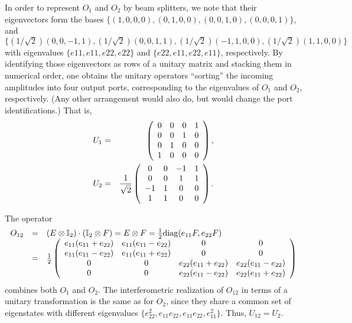 \documentclass[12pt]{iopart}
\begin{document}
In order to represent $O_1$ and $O_2$ by beam splitters,
we note that their eigenvectors form the bases
$
\{(1, 0, 0, 0), (0, 1, 0, 0), (0, 0, 1, 0),  (0, 0, 0, 1)\}$, and
$
\{(1/ \sqrt{2})(0, 0, -1, 1),(1/ \sqrt{2})(0, 0, 1, 1),  (1/ \sqrt{2})(-1, 1, 0, 0), (1/ \sqrt{2})(1, 1, 0, 0)\}
$
with eigenvalues
$\{e11, e11, e22, e22\}$
and
$\{e22, e11, e22, e11\}$, respectively.
By identifying those eigenvectors as rows of a unitary
matrix and stacking them in numerical order, one obtains the
unitary operators ``sorting'' the incoming
amplitudes into four output ports, corresponding to the eigenvalues
of $O_1$ and $O_2$, respectively.
(Any other arrangement would also do, but would change the port identifications.)
That is,
\begin{eqnarray}
U_1 & = &
\left(
\begin{array}{cccc}
0&0&0&1\\
0&0&1&0\\
0&1&0&0\\
1&0&0&0
\end{array}
\right)
,    \label{2004-analog-ea1}
\\
U_2 & = & {1\over  \sqrt{2}}
\left(
\begin{array}{cccc}
0& 0& -1& 1\\
0& 0& 1& 1\\
-1& 1& 0& 0    \\
1& 1& 0& 0
\end{array}
\right)   \label{2004-analog-ea2}
.
\end{eqnarray}

The operator
\begin{equation}
\begin{array}{lll}
O_{12}&=&(E\otimes {\Bbb I}_2)\cdot ({\Bbb I}_2\otimes F)
=E\otimes F
=
{1\over {2}}
{\rm diag}(e_{11} F, e_{22} F)
\\
&=&
{1\over  {2}}
\left(
\begin{array}{cccc}
e_{11} (e_{11} + e_{22})& e_{11} (e_{11} - e_{22})& 0& 0\\
e_{11} (e_{11} - e_{22})& e_{11} (e_{11} + e_{22})& 0& 0\\
0& 0& e_{22} (e_{11} + e_{22})&  e_{22}(e_{11} - e_{22})\\
0& 0&  e_{22}(e_{11} - e_{22})& e_{22} (e_{11} + e_{22})
\end{array}
\right)
\end{array} \label{2004-analog-u12}
\end{equation}
combines both $O_1$ and $O_2$.
The interferometric realization of $O_{12}$ in terms of a unitary transformation
is the same as for $O_2$, since they share a common set of eigenstates
with different eigenvalues
$\{e_{22}^2,  e_{11} e_{22},  e_{11} e_{22},  e_{11}^2\}$. Thus,
$U_{12} =U_2$.
\end{document}
